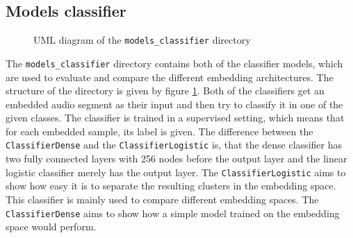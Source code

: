 \subsection{Models classifier}
\label{sub:Component-Models-Classifier}
\begin{figure}[htbp]
	\centering
	\caption{UML diagram of the \texttt{models\_classifier} directory}
	\label{fig:UML-Models-Classifier}
\end{figure}
\noindent
The \texttt{models\_classifier} directory contains both of the classifier models, which are used to evaluate and compare the different embedding architectures. The structure of the directory is given by figure \ref{fig:UML-Models-Classifier}. Both of the classifiers get an embedded audio segment as their input and then try to classify it in one of the given classes. The classifier is trained in a supervised setting, which means that for each embedded sample, its label is given.
\newline
\newline
The difference between the \texttt{ClassifierDense} and the \texttt{ClassifierLogistic} is, that the dense classifier has two fully connected layers with 256 nodes before the output layer and the linear logistic classifier merely has the output layer. The \texttt{ClassifierLogistic} aims to show how easy it is to separate the resulting clusters in the embedding space. This classifier is mainly used to compare different embedding spaces. The \texttt{ClassifierDense} aims to show how a simple model trained on the embedding space would perform.

